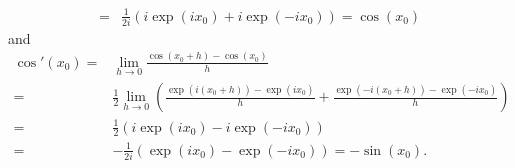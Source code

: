 \begin{example}
\begin{enumerate}[a)]
\[\begin{aligned}
=&\frac1{2i}(i\exp(ix_0)+i\exp(-ix_0))=\cos(x_0)
\end{aligned}
\]
and
\[\begin{aligned}
\cos'(x_0)=&\lim_{h\to0}\frac{\cos(x_0+h)-\cos(x_0)}{h}\\
=&\frac1{2}\lim_{h\to0}\left(\frac{\exp(i(x_0+h))-\exp(ix_0)}{h}+\frac{\exp(-i(x_0+h))-\exp(-ix_0)}{h}\right)\\
=&\frac1{2}(i\exp(ix_0)-i\exp(-ix_0))\\=&
-\frac1{2i}(\exp(ix_0)-\exp(-ix_0))=-\sin(x_0).
\end{aligned}
\]
\end{enumerate}
\end{example}

